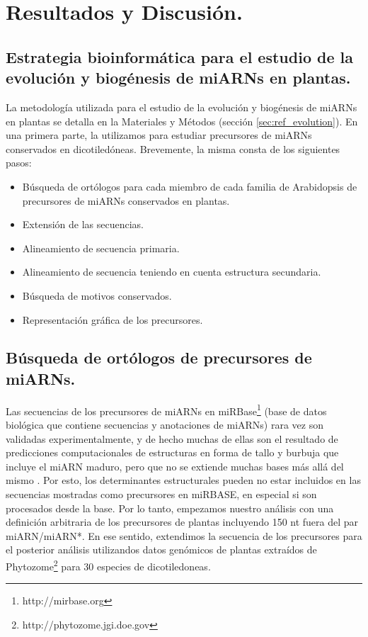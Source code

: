 \section{Resultados y Discusión.}

\subsection{Estrategia bioinformática para el estudio de la evolución y biogénesis de miARNs en plantas.}

La metodología utilizada para el estudio de la evolución y biogénesis de miARNs en plantas se detalla en la Materiales y Métodos (sección \ref{sec:ref_evolution}).
En una primera parte, la utilizamos para estudiar precursores de miARNs conservados en dicotiledóneas. 
Brevemente, la misma consta de los siguientes pasos:

\begin{itemize}
    \item Búsqueda de ortólogos para cada miembro de cada familia de Arabidopsis de  precursores de miARNs conservados en plantas.
    \item Extensión de las secuencias.
    \item Alineamiento de secuencia primaria.
    \item Alineamiento de secuencia teniendo en cuenta estructura secundaria.
    \item Búsqueda de motivos conservados.
    \item Representación gráfica de los precursores.
\end{itemize}

\subsection{Búsqueda de ortólogos de precursores de miARNs.}

Las secuencias de los precursores de miARNs en miRBase\footnote{http://mirbase.org} (base de datos biológica que contiene secuencias y anotaciones de miARNs) rara vez son validadas experimentalmente, y de hecho muchas de ellas son el resultado de predicciones computacionales de estructuras en forma de tallo y burbuja que incluye el miARN maduro, pero que no se extiende muchas bases más allá del mismo \cite{Kozomara2014}.
Por esto, los determinantes estructurales pueden no estar incluidos en las secuencias mostradas como precursores en miRBASE, en especial si son procesados desde la base.
Por lo tanto, empezamos nuestro análisis con una definición arbitraria de los precursores de plantas incluyendo 150 nt fuera del par miARN/miARN*.
En ese sentido, extendimos la secuencia de los precursores para el posterior análisis utilizandos datos genómicos de plantas extraídos de Phytozome\footnote{http://phytozome.jgi.doe.gov} para 30 especies de dicotiledoneas.

